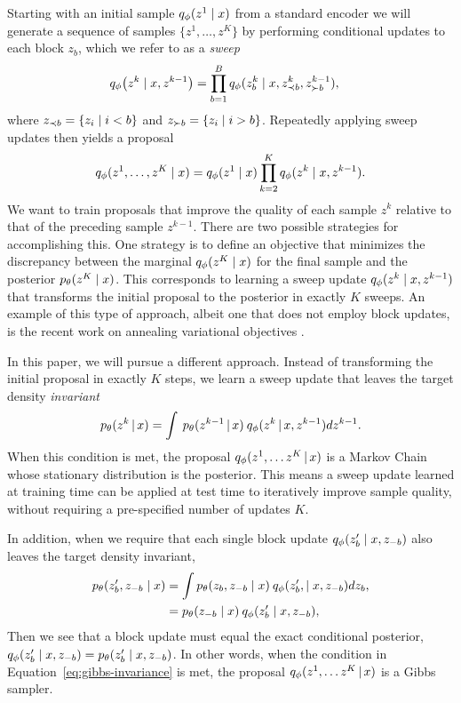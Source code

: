 \documentclass{article}
\theoremstyle{definition}
\begin{document}
Starting with an initial sample $q_\phi(z^{1} \mid x)$ from a standard encoder we will generate a sequence of samples $\{z^1, \ldots, z^K\}$ by performing conditional updates to each block $z_b$, which we refer to as a \emph{sweep}
\begin{align}
    \label{eq:approx-gibbs-kernel}
    q_\phi \big( z^k \mid x, z^{k-1} \big)
    &=
    \prod_{b=1}^B
    q_\phi(z^k_b \mid x, z^{k}_{\prec b}, z^{k-1}_{\succ b})
    ,
\end{align}
where $z_{\prec b} = \{z_i \mid i < b\}$ and $z_{\succ b} = \{z_i \mid i > b\}$. Repeatedly applying sweep updates then yields a proposal
\begin{equation*}
    q_\phi(z^1, \ldots, z^K \mid x) 
    =
    q_\phi(z^1 \mid x)
    \prod_{k=2}^K
    q_\phi(z^k \mid x, z^{k-1}).
\end{equation*}
We want to train proposals that improve the quality of each sample $z^k$ relative to that of the preceding sample $z^{k-1}$. There are two possible strategies for accomplishing this. One strategy is to define an objective that minimizes the discrepancy between the marginal $q_\phi(z^K \mid x)$ for the final sample and the posterior $p_\theta(z^K \mid x)$. This corresponds to learning a sweep update $q_\phi(z^k \mid x, z^{k-1})$ that transforms the initial proposal to the posterior in exactly $K$ sweeps. An example of this type of approach, albeit one that does not employ block updates, is the recent work on annealing variational objectives \cite{huang2018improving}.

In this paper, we will pursue a different approach. Instead of transforming the initial proposal in exactly $K$ steps, we learn a sweep update that leaves the target density \emph{invariant}
\begin{equation}
    \label{eq:kernel-invariance}
    p_\theta(z^k \,|\, x) = \int \: p_\theta(z^{k-1} \,|\, x) \: q_\phi(z^k \,|\,x, z^{k-1}) d z^{k-1}.
\end{equation}
When this condition is met, the proposal $q_\phi(z^1, \ldots z^K \,|\, x)$ is a Markov Chain whose stationary distribution is the posterior. 
This means a sweep update learned at training time can be applied at test time to iteratively improve sample quality, without requiring a pre-specified number of updates $K$.


In addition, when we require that each single block update $q_\phi(z'_b \mid x, z_{-b})$ also leaves the target density invariant,
\begin{align}
    \label{eq:gibbs-invariance}
    p_\theta(z'_b, z_{-b} \mid x)
    &= 
    \int 
    p_\theta(z_b, z_{-b} \mid x) \:
    q_\phi(z'_b, \mid x, z_{-b}) 
    dz_{b},
    \\
    &= 
    p_\theta(z_{-b} \mid x) \:
    q_\phi(z'_b \mid x, z_{-b})
    , \nonumber
\end{align}
Then we see that a block update must equal the exact conditional posterior, $q_\phi(z'_b \mid x, z_{-b}) = p_\theta(z'_b \mid x, z_{-b})$.
In other words, when the condition in Equation~\ref{eq:gibbs-invariance} is met, the proposal $q_\phi(z^1, \ldots z^K \,|\, x)$ is a Gibbs sampler.
\end{document}
